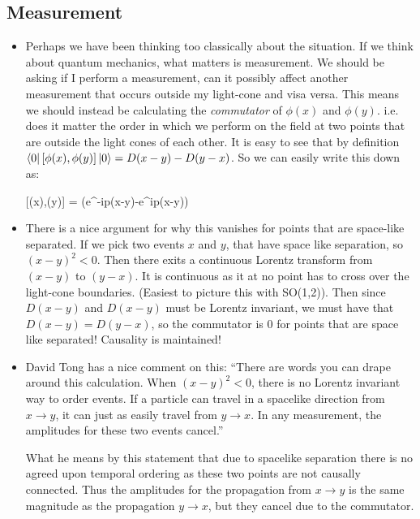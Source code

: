 \documentclass[11pt]{article}
\renewenvironment{flalign}{\vspace{-3mm}\empheq[box=\tcbhighmath]{align}}{\endempheq}
\numberwithin{equation}{section}
\begin{document}
\subsection{Measurement}
\begin{itemize}
  \item Perhaps we have been thinking too classically about the situation. If we think about quantum mechanics, what matters is measurement. We should be asking if I perform a measurement, can it possibly affect another measurement that occurs outside my light-cone and visa versa. This means we should instead be calculating the \emph{commutator} of $\phi(x)$ and $\phi(y)$. i.e. does it matter the order in which we perform on the field at two points that are outside the light cones of each other. It is easy to see that by definition $\bra{0}[\phi(x),\phi(y)]\ket{0} = D(x-y)-D(y-x)$. So we can easily write this down as:

  \begin{flalign}
  \label{KG_prop}
    [\phi(x),\phi(y)] = \int {} \left(e^{-ip(x-y)}-e^{ip(x-y)}\right)
    \end{flalign} 
  
  \item There is a nice argument for why this vanishes for points that are space-like separated. If we pick two events $x$ and $y$, that have space like separation, so $(x-y)^2 < 0$. Then there exits a continuous Lorentz transform from $(x-y)$ to $(y-x)$. It is continuous as it at no point has to cross over the light-cone boundaries. (Easiest to picture this with SO(1,2)). Then since $D(x-y)$ and $D(x-y)$ must be Lorentz invariant, we must have that $D(x-y)=D(y-x)$, so the commutator is $0$ for points that are space like separated! Causality is maintained!  

      \item David Tong has a nice comment on this: ``There are words you can drape around this calculation. When $(x-y)^2<0$, there is no Lorentz invariant way to order events. If a particle can travel in a spacelike direction from $x \rightarrow y$, it can just as easily travel from $y \rightarrow x$. In any measurement, the amplitudes for these two events cancel.''  

      What he means by this statement that due to spacelike separation there is no agreed upon temporal ordering as these two points are not causally connected. Thus the amplitudes for the propagation from $x \rightarrow y$ is the same magnitude as the propagation $y \rightarrow x$, but they cancel due to the commutator.     
\end{itemize}
\end{document}
